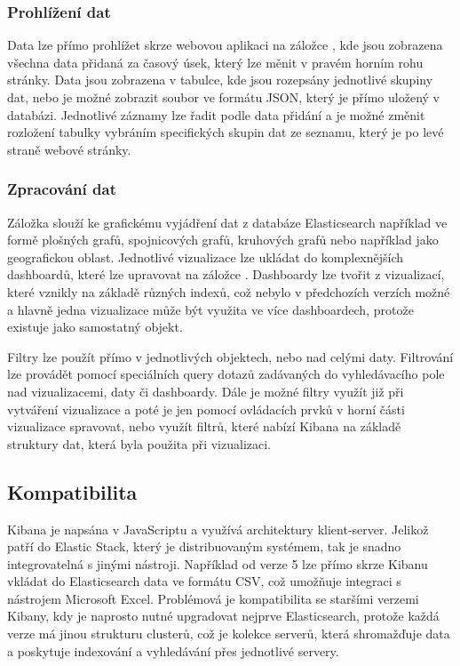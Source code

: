 \documentclass[czech,BP]{thesiskiv}
\begin{document}
 \subsubsection{Prohlížení dat}
 Data lze přímo prohlížet skrze webovou aplikaci na záložce , kde jsou zobrazena všechna data přidaná za časový úsek, který lze měnit v pravém horním rohu stránky. Data jsou zobrazena v tabulce, kde jsou rozepsány jednotlivé skupiny dat, nebo je možné zobrazit soubor ve formátu JSON, který je přímo uložený v databázi. Jednotlivé záznamy lze řadit podle data přidání a je možné změnit rozložení tabulky vybráním specifických skupin dat ze seznamu, který je po levé straně webové stránky.
 
 \subsubsection{Zpracování dat}
 Záložka  slouží ke grafickému vyjádření dat z databáze Elasticsearch například ve formě plošných grafů, spojnicových grafů, kruhových grafů nebo například jako geografickou oblast. Jednotlivé vizualizace lze ukládat do komplexnějších dashboardů, které lze upravovat na záložce . Dashboardy lze tvořit z vizualizací, které vznikly na základě různých indexů, což nebylo v předchozích verzích možné a hlavně jedna vizualizace může být využita ve více dashboardech, protože existuje jako samostatný objekt.
 
 
 Filtry lze použít přímo v jednotlivých objektech, nebo nad celými daty. Filtrování lze provádět pomocí speciálních query dotazů zadávaných do vyhledávacího pole nad vizualizacemi, daty či dashboardy. Dále je možné filtry využít již při vytváření vizualizace a poté je jen pomocí ovládacích prvků v horní části vizualizace spravovat, nebo využít filtrů, které nabízí Kibana na základě struktury dat, která byla použita při vizualizaci.\cite{KibanaQueries}
 
 \subsection{Kompatibilita}
	Kibana je napsána v JavaScriptu a využívá architektury klient-server. Jelikož patří do Elastic Stack, který je distribuovaným systémem, tak je snadno integrovatelná s jinými nástroji. Například od verze 5 lze přímo skrze Kibanu vkládat do Elasticsearch data ve formátu CSV, což umožňuje integraci s nástrojem Microsoft Excel. Problémová je kompatibilita se staršími verzemi Kibany, kdy je naprosto nutné upgradovat nejprve Elasticsearch, protože každá verze má jinou strukturu clusterů, což je kolekce serverů, která shromažďuje data a poskytuje indexování a vyhledávání přes jednotlivé servery.\cite{KibanaClusters}
 
\end{document}
